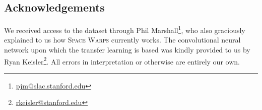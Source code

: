\documentclass[10pt,twocolumn,letterpaper]{article}
\begin{document}
\subsection*{Acknowledgements}
We received access to the dataset through Phil Marshall\footnote{\url{pjm@slac.stanford.edu}}, who also graciously explained to us how
\textsc{Space Warps}
currently works. The convolutional neural network upon which the transfer
learning is based was kindly provided to us by Ryan Keisler\footnote{\url{rkeisler@stanford.edu}}.
All errors in interpretation or otherwise are entirely our own.


{\small


}
\end{document}

